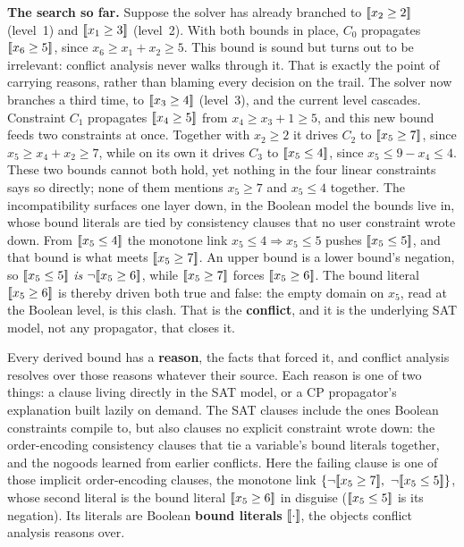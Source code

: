 \textbf{The search so far.} Suppose the solver has already branched to
$[\![x_2 \ge 2]\!]$ (level~1) and $[\![x_1 \ge 3]\!]$
(level~2). With both bounds in place, $C_0$ propagates
$[\![x_6 \ge 5]\!]$, since $x_6 \ge x_1 + x_2 \ge 5$. This bound is
sound but turns out to be irrelevant: conflict analysis never walks through it.
That is exactly the point of carrying reasons, rather than blaming every decision
on the trail. The solver now branches a third time, to
$[\![x_3 \ge 4]\!]$ (level~3), and the current level cascades.
Constraint $C_1$ propagates $[\![x_4 \ge 5]\!]$ from
$x_4 \ge x_3 + 1 \ge 5$, and this new bound feeds two constraints at once.
Together with $x_2 \ge 2$ it drives $C_2$ to $[\![x_5 \ge 7]\!]$,
since $x_5 \ge x_4 + x_2 \ge 7$, while on its own it drives $C_3$ to
$[\![x_5 \le 4]\!]$, since $x_5 \le 9 - x_4 \le 4$. These two
bounds cannot both hold, yet nothing in the four linear constraints says so
directly; none of them mentions $x_5 \ge 7$ and $x_5 \le 4$ together. The
incompatibility surfaces one layer down, in the Boolean model the bounds live in,
whose bound literals are tied by consistency clauses that no user constraint
wrote down. From $[\![x_5 \le 4]\!]$ the monotone link $x_5 \le 4 \Rightarrow x_5 \le
5$ pushes $[\![x_5 \le 5]\!]$, and that bound is what meets
$[\![x_5 \ge 7]\!]$. An upper bound is a lower bound's negation, so
$[\![x_5 \le 5]\!]$ \emph{is} $\lnot[\![x_5 \ge 6]\!]$,
while $[\![x_5 \ge 7]\!]$ forces $[\![x_5 \ge 6]\!]$.
The bound literal $[\![x_5 \ge 6]\!]$ is thereby driven both true and
false: the empty domain on $x_5$, read at the Boolean level, is this clash. That
is the \textbf{conflict}, and it is the underlying SAT model, not any propagator,
that closes it.

Every derived bound has a \textbf{reason}, the facts that forced it, and conflict
analysis resolves over those reasons whatever their source. Each reason is one of
two things: a clause living directly in the SAT model, or a CP propagator's
explanation built lazily on demand. The SAT clauses include the ones Boolean
constraints compile to, but also clauses no explicit constraint wrote down: the
order-encoding consistency clauses that tie a variable's bound literals together, and
the nogoods learned from earlier conflicts. Here the failing clause is one of those
implicit order-encoding clauses, the monotone link $\{\lnot[\![x_5 \ge 7]\!],\
\lnot[\![x_5 \le 5]\!]\}$, whose second literal is the bound literal
$[\![x_5 \ge 6]\!]$ in disguise ($[\![x_5 \le 5]\!]$
is its negation). Its literals are Boolean \textbf{bound literals} $[\![\cdot]\!]$, the objects conflict analysis reasons over.

